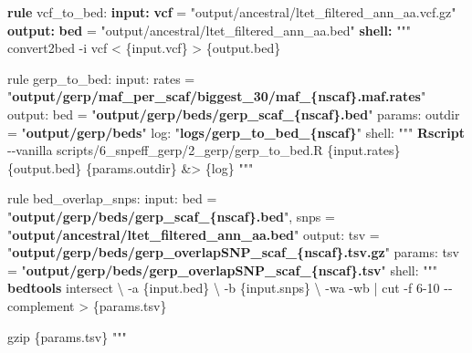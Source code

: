 \documentclass[
  letterpaper,
  DIV=11,
  numbers=noendperiod]{scrreprt}
\newenvironment{Shaded}{}{}
\newcommand{\AttributeTok}[1]{\textcolor[rgb]{0.84,0.23,0.29}{#1}}
\newcommand{\DataTypeTok}[1]{\textcolor[rgb]{0.84,0.23,0.29}{#1}}
\newcommand{\ExtensionTok}[1]{\textcolor[rgb]{0.84,0.23,0.29}{\textbf{#1}}}
\newcommand{\FunctionTok}[1]{\textcolor[rgb]{0.44,0.26,0.76}{#1}}
\newcommand{\KeywordTok}[1]{\textcolor[rgb]{0.84,0.23,0.29}{#1}}
\newcommand{\NormalTok}[1]{\textcolor[rgb]{0.14,0.16,0.18}{#1}}
\newcommand{\OperatorTok}[1]{\textcolor[rgb]{0.14,0.16,0.18}{#1}}
\newcommand{\StringTok}[1]{\textcolor[rgb]{0.01,0.18,0.38}{#1}}
\begin{document}
\begin{Shaded}
\begin{Highlighting}[]
\ExtensionTok{rule}\NormalTok{ vcf\_to\_bed:}
    \ExtensionTok{input:}
        \ExtensionTok{vcf}\NormalTok{ = }\StringTok{"output/ancestral/ltet\_filtered\_ann\_aa.vcf.gz"}
    \ExtensionTok{output:}
        \ExtensionTok{bed}\NormalTok{ = }\StringTok{"output/ancestral/ltet\_filtered\_ann\_aa.bed"}
    \ExtensionTok{shell:}
        \StringTok{"""}
\StringTok{        convert2bed {-}i vcf \textless{} \{input.vcf\} \textgreater{} \{output.bed\}}

\StringTok{rule gerp\_to\_bed:}
\StringTok{    input:}
\StringTok{        rates = "}\ExtensionTok{output/gerp/maf\_per\_scaf/biggest\_30/maf\_\{nscaf\}.maf.rates}\StringTok{"}
\StringTok{    output:}
\StringTok{        bed = "}\ExtensionTok{output/gerp/beds/gerp\_scaf\_\{nscaf\}.bed}\StringTok{"}
\StringTok{    params:}
\StringTok{        outdir = "}\ExtensionTok{output/gerp/beds}\StringTok{"}
\StringTok{    log: "}\ExtensionTok{logs/gerp\_to\_bed\_\{nscaf\}}\StringTok{"}
\StringTok{    shell:}
\StringTok{        """}
        \ExtensionTok{Rscript} \AttributeTok{{-}{-}vanilla}\NormalTok{ scripts/6\_snpeff\_gerp/2\_gerp/gerp\_to\_bed.R \{input.rates\} \{output.bed\} \{params.outdir\} }\OperatorTok{\&\textgreater{}}\NormalTok{ \{log\}}
        \StringTok{"""}

\StringTok{rule bed\_overlap\_snps:}
\StringTok{    input:}
\StringTok{        bed = "}\ExtensionTok{output/gerp/beds/gerp\_scaf\_\{nscaf\}.bed}\StringTok{",}
\StringTok{        snps = "}\ExtensionTok{output/ancestral/ltet\_filtered\_ann\_aa.bed}\StringTok{"}
\StringTok{    output:}
\StringTok{        tsv = "}\ExtensionTok{output/gerp/beds/gerp\_overlapSNP\_scaf\_\{nscaf\}.tsv.gz}\StringTok{"}
\StringTok{    params:}
\StringTok{        tsv = "}\ExtensionTok{output/gerp/beds/gerp\_overlapSNP\_scaf\_\{nscaf\}.tsv}\StringTok{"    }
\StringTok{    shell:}
\StringTok{        """}
        \ExtensionTok{bedtools}\NormalTok{ intersect }\DataTypeTok{\textbackslash{}}
        \AttributeTok{{-}a}\NormalTok{ \{input.bed\} }\DataTypeTok{\textbackslash{}}
        \AttributeTok{{-}b}\NormalTok{ \{input.snps\} }\DataTypeTok{\textbackslash{}}
        \AttributeTok{{-}wa} \AttributeTok{{-}wb} \KeywordTok{|}
        \FunctionTok{cut} \AttributeTok{{-}f}\NormalTok{ 6{-}10 }\AttributeTok{{-}{-}complement} \OperatorTok{\textgreater{}}\NormalTok{ \{params.tsv\}}

        \FunctionTok{gzip}\NormalTok{ \{params.tsv\}}
        \StringTok{"""}
\end{Highlighting}
\end{Shaded}
\end{document}
